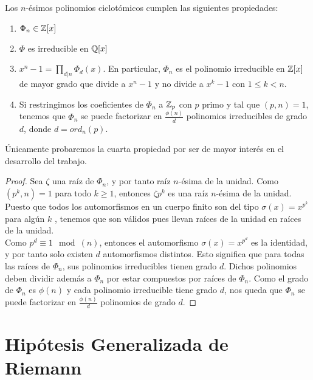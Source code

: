 \begin{proposicion}
	Los $n$-ésimos polinomios ciclotómicos cumplen las siguientes propiedades:
	
	\begin{enumerate}
		\item $\Phi_n \in \mathbb{Z}[x]$
		
		\item $\Phi$ es irreducible en $\mathbb{Q}[x]$
		
		\item $x^n - 1 = \prod_{d|n}\Phi_d(x)$. En particular, $\Phi_n$ es el polinomio irreducible en $\mathbb{Z}[x]$ de mayor grado que divide a $x^n - 1$ y no divide a $x^k - 1$ con $1 \leq k < n$.
		
		\item Si restringimos los coeficientes de $\Phi_n$ a $\mathbb{Z}_p$ con $p$ primo y tal que $(p, n) = 1$, tenemos que $\Phi_n$ se puede factorizar en $\frac{\phi(n)}{d}$ polinomios irreducibles de grado $d$, donde $d = ord_n(p)$.
	\end{enumerate}
\end{proposicion}

Únicamente probaremos la cuarta propiedad por ser de mayor interés en el desarrollo del trabajo.

\begin{proof}
	Sea $\zeta$ una raíz de $\Phi_n$, y por tanto raíz $n$-ésima de la unidad. Como $(p^k, n) = 1$ para todo $k \geq 1$, entonces $\zeta{p^k}$ es una raíz $n$-ésima de la unidad. Puesto que todos los automorfismos en un cuerpo finito son del tipo $\sigma(x) = x^{p^k}$ para algún $k$ \cite{mullen_panario_2013}, tenemos que son válidos pues llevan raíces de la unidad en raíces de la unidad.\\
	
	Como $p^d \equiv 1 \mod(n)$, entonces el automorfismo $\sigma(x) = x^{p^d}$ es la identidad, y por tanto solo existen $d$ automorfismos distintos. Esto significa que para todas las raíces de $\Phi_n$, sus polinomios irreducibles tienen grado $d$. Dichos polinomios deben dividir además a $\Phi_n$ por estar compuestos por raíces de $\Phi_n$. Como el grado de $\Phi_n$ es $\phi(n)$ y cada polinomio irreducible tiene grado $d$, nos queda que $\Phi_n$ se puede factorizar en $\frac{\phi(n)}{d}$ polinomios de grado $d$.
\end{proof}

\section{Hipótesis Generalizada de Riemann}

